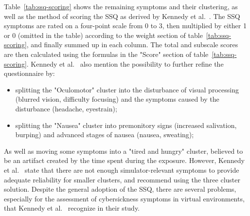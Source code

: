 Table~\ref{tab:ssq-scoring} shows the remaining symptoms and their clustering, as well as the method of scoring the
SSQ as derived by Kennedy et al.~\cite{Kennedy1993}.
The SSQ symptoms are rated on a four-point scale from 0 to 3, then multiplied by either 1 or 0 (omitted in the table)
according to the weight section of table~\ref{tab:ssq-scoring}, and finally summed up in each column.
The total and subscale scores are then calculated using the formulas in the "Score" section of
table~\ref{tab:ssq-scoring}.
Kennedy et al.~\cite{Kennedy1993} also mention the possibility to further refine the questionnaire by:
\begin{itemize}
    \item splitting the "Oculomotor" cluster into the disturbance of visual processing (blurred vision, difficulty
    focusing) and the symptoms caused by the disturbance (headache, eyestrain);
    \item splitting the "Nausea" cluster into premonitory signs (increased salivation, burping) and advanced stages
    of nausea (nausea, sweating);
\end{itemize}
As well as moving some symptoms into a "tired and hungry" cluster, believed to be an artifact created by the time
spent during the exposure.
However, Kennedy et al.~\cite{Kennedy1993} state that there are not enough simulator-relevant symptoms to provide
adequate reliability for smaller clusters, and recommend using the three cluster solution.
Despite the general adoption of the SSQ, there are several problems, especially for the assessment of
cybersickness symptoms in virtual environments, that Kennedy et al.~\cite{Kennedy1993} recognize in their study.
